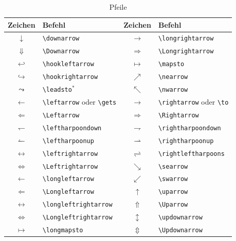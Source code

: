 \documentclass[a4paper,10pt,twoside]{scrbook}
\begin{document}
{\begin{table}[h!tb]
\centering
\caption{Pfeile}
\label{Tabelle_Pfeile}       %
\begin{tabular}{clcl}
\hline
Zeichen & Befehl & Zeichen & Befehl  \\
\hline
$\downarrow$ & \texttt{\textbackslash downarrow} & 
$\longrightarrow$ & \texttt{\textbackslash longrightarrow}\\
$\Downarrow$ & \texttt{\textbackslash Downarrow} & 
$\Longrightarrow$ & \texttt{\textbackslash Longrightarrow}\\
$\hookleftarrow$ & \texttt{\textbackslash hookleftarrow} & 
$\mapsto$ & \texttt{\textbackslash mapsto} \\
$\hookrightarrow$ & \texttt{\textbackslash hookrightarrow} &  
$\nearrow$ & \texttt{\textbackslash nearrow} \\
$\leadsto$ & \texttt{\textbackslash leadsto$^\ast$} &  
$\nwarrow$ & \texttt{\textbackslash nwarrow} \\
$\leftarrow$ & \texttt{\textbackslash leftarrow} oder \texttt{\textbackslash gets}& 
$\rightarrow$ & \texttt{\textbackslash rightarrow} oder \texttt{\textbackslash to}\\
$\Leftarrow$ & \texttt{\textbackslash Leftarrow} & 
$\Rightarrow$ & \texttt{\textbackslash Rightarrow} \\
$\leftharpoondown$ & \texttt{\textbackslash leftharpoondown} & 
$\rightharpoondown$ & \texttt{\textbackslash rightharpoondown} \\
$\leftharpoonup$ & \texttt{\textbackslash leftharpoonup} & 
$\rightharpoonup$ & \texttt{\textbackslash rightharpoonup} \\
$\leftrightarrow$ & \texttt{\textbackslash leftrightarrow} & 
$\rightleftharpoons$ & \texttt{\textbackslash rightleftharpoons} \\
$\Leftrightarrow$ & \texttt{\textbackslash Leftrightarrow} & 
$\searrow$ & \texttt{\textbackslash searrow} \\
$\longleftarrow$ & \texttt{\textbackslash longleftarrow} & 
$\swarrow$ & \texttt{\textbackslash swarrow} \\
$\Longleftarrow$ & \texttt{\textbackslash Longleftarrow} & 
$\uparrow$ & \texttt{\textbackslash uparrow} \\
$\longleftrightarrow$ & \texttt{\textbackslash longleftrightarrow} & 
$\Uparrow$ & \texttt{\textbackslash Uparrow} \\
$\Longleftrightarrow$ & \texttt{\textbackslash Longleftrightarrow} & 
$\updownarrow$ & \texttt{\textbackslash updownarrow} \\
$\longmapsto$ & \texttt{\textbackslash longmapsto}& 
$\Updownarrow$ & \texttt{\textbackslash Updownarrow} \\
\hline
\end{tabular}
\end{table}

}
\end{document}
